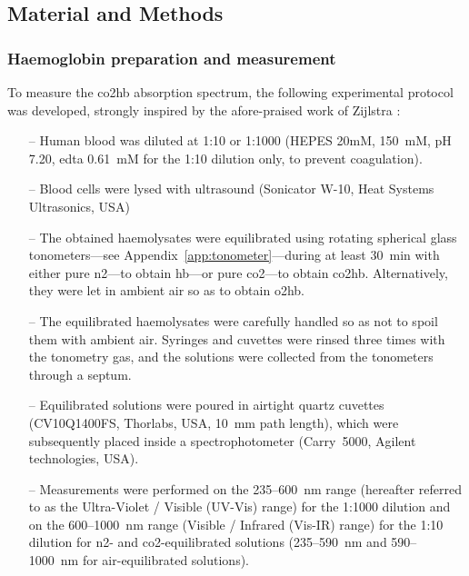 \subsection{Material and Methods}

\subsubsection{Haemoglobin preparation and measurement}\label{subsect:co2hb:pulse_carbametry:hb_prep}

To measure the \gls{co2hb} absorption spectrum, the following experimental protocol was developed, strongly inspired by the afore-praised work of Zijlstra \etal{}\cite{zijlstra2000}:

\begin{itemize}
	\item[--] Human blood was diluted at 1:10 or 1:1000 (HEPES 20mM,  150~mM, pH 7.20, \gls{edta} 0.61~mM for the 1:10 dilution only, to prevent coagulation).
	\item[--] Blood cells were lysed with ultrasound (Sonicator W-10, Heat Systems Ultrasonics, USA)
	\item[--] The obtained haemolysates were equilibrated using rotating spherical glass tonometers---see Appendix~\ref{app:tonometer}---during at least 30~min with either pure \gls{n2}---to obtain \gls{hb}---or pure \gls{co2}---to obtain \gls{co2hb}. Alternatively, they were let in ambient air so as to obtain \gls{o2hb}.
	\item[--] The equilibrated haemolysates were carefully handled so as not to spoil them with ambient air. Syringes and cuvettes were rinsed three times with the tonometry gas, and the solutions were collected from the tonometers through a septum.
	\item[--] Equilibrated solutions were poured in airtight quartz cuvettes (CV10Q1400FS, Thorlabs, USA, 10~mm path length), which were subsequently placed inside a spectrophotometer (Carry~5000, Agilent technologies, USA).
	\item[--] Measurements were performed on the 235--600~nm range (hereafter referred to as the Ultra-Violet / Visible (UV-Vis) range) for the 1:1000 dilution and on the 600--1000~nm range (Visible / Infrared (Vis-IR) range) for the 1:10 dilution for \gls{n2}- and \gls{co2}-equilibrated solutions (235--590~nm and 590--1000~nm for air-equilibrated solutions).
\end{itemize}

